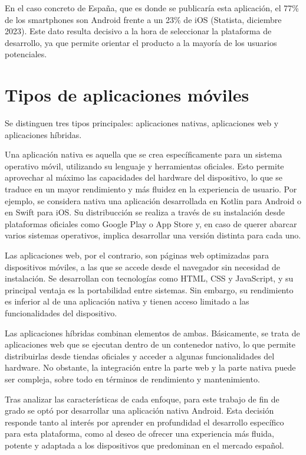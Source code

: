 En el caso concreto de España, que es donde se publicaría esta aplicación, el 77\% de los smartphones son Android frente a un 23\% de iOS (Statista, diciembre 2023). Este dato resulta decisivo a la hora de seleccionar la plataforma de desarrollo, ya que permite orientar el producto a la mayoría de los usuarios potenciales.

\section{Tipos de aplicaciones móviles}

Se distinguen tres tipos principales: aplicaciones nativas, aplicaciones web y aplicaciones híbridas.

Una aplicación nativa es aquella que se crea específicamente para un sistema operativo móvil, utilizando su lenguaje y herramientas oficiales. Esto permite aprovechar al máximo las capacidades del hardware del dispositivo, lo que se traduce en un mayor rendimiento y más fluidez en la experiencia de usuario. Por ejemplo, se considera nativa una aplicación desarrollada en Kotlin para Android o en Swift para iOS. Su distribucción se realiza a través de su instalación desde plataformas oficiales como Google Play o App Store y, en caso de querer abarcar varios sistemas operativos, implica desarrollar una versión distinta para cada uno.

Las aplicaciones web, por el contrario, son páginas web optimizadas para dispositivos móviles, a las que se accede desde el navegador sin necesidad de instalación. Se desarrollan con tecnologías como HTML, CSS y JavaScript, y su principal ventaja es la portabilidad entre sistemas. Sin embargo, su rendimiento es inferior al de una aplicación nativa y tienen acceso limitado a las funcionalidades del dispositivo.

Las aplicaciones híbridas combinan elementos de ambas. Básicamente, se trata de aplicaciones web que se ejecutan dentro de un contenedor nativo, lo que permite distribuirlas desde tiendas oficiales y acceder a algunas funcionalidades del hardware. No obstante, la integración entre la parte web y la parte nativa puede ser compleja, sobre todo en términos de rendimiento y mantenimiento.

Tras analizar las características de cada enfoque, para este trabajo de fin de grado se optó por desarrollar una aplicación nativa Android. Esta decisión responde tanto al interés por aprender en profundidad el desarrollo específico para esta plataforma, como al deseo de ofrecer una experiencia más fluida, potente y adaptada a los dispositivos que predominan en el mercado español.

